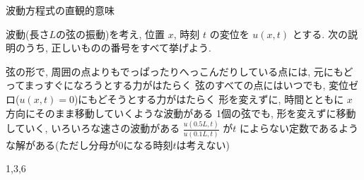 \makeatletter  
{}%
\makeatother
\begin{theme}{波動方程式の直観的意味}
  \begin{memo}
  \end{memo}
\begin{prob}
波動(長さ$L$の弦の振動)を考え, 位置 $x$, 時刻 $t$ の変位を $u(x,t)$ とする. 次の説明のうち, 正しいものの番号をすべて挙げよう.
  \begin{enumerate}
  \itemtrue 弦の形で, 周囲の点よりもでっぱったりへっこんだりしている点には, 元にもどってまっすぐになろうとする力がはたらく
  \itemfalse 弦のすべての点にはいつでも, 変位ゼロ($u(x,t)=0$)にもどそうとする力がはたらく
  \itemtrue 形を変えずに, 時間とともに $x$ 方向にそのまま移動していくような波動がある
  \itemfalse 1個の弦でも, 形を変えずに移動していく, いろいろな速さの波動がある
  \itemtrue $\frac{u(0.5L,t)}{u(0.1L,t)}$ が$t$ によらない定数であるような解がある(ただし分母が0になる時刻$t$は考えない)
  \end{enumerate}
  \end{prob}
\begin{sol}
  1,3,6
\end{sol}
\end{theme}

\makeatletter
{}
\makeatother


